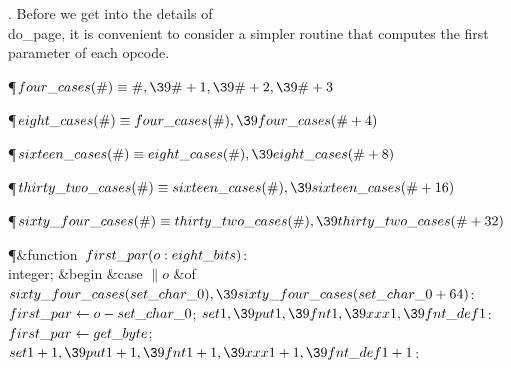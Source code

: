 . Before we get into the details of \\{do\_page}, it is convenient to
consider a simpler routine that computes the first parameter of each
opcode.

\Y\P\D {}$\\{four\_cases}(\#)\S\#,\39\#+1,\39\#+2,\39\#+3$\par
\P\D {}$\\{eight\_cases}(\#)\S\\{four\_cases}(\#),\39\\{four\_cases}(\#+4)$\par
\P\D {}$\\{sixteen\_cases}(\#)\S\\{eight\_cases}(\#),\39\\{eight\_cases}(%
\#+8)$\par
\P\D {}$\\{thirty\_two\_cases}(\#)\S\\{sixteen\_cases}(\#),\39\\{sixteen%
\_cases}(\#+16)$\par
\P\D {}$\\{sixty\_four\_cases}(\#)\S\\{thirty\_two\_cases}(\#),\39\\{thirty%
\_two\_cases}(\#+32)$\par
\Y\P\4\&{function}\1\  $\\{first\_par}(\|o:\\{eight\_bits})$: %
\\{integer};\2\6
\&{begin} \&{case} $\|o$ \1\&{of}\6
\4$\\{sixty\_four\_cases}(\\{set\_char\_0}),\39\\{sixty\_four\_cases}(\\{set%
\_char\_0}+64)$: $\\{first\_par}\K\|o-\\{set\_char\_0}$;\6
\4$\\{set1},\39\\{put1},\39\\{fnt1},\39\\{xxx1},\39\\{fnt\_def1}$: $\\{first%
\_par}\K\\{get\_byte}$;\6
\4$\\{set1}+1,\39\\{put1}+1,\39\\{fnt1}+1,\39\\{xxx1}+1,\39\\{fnt\_def1}+1$: %
